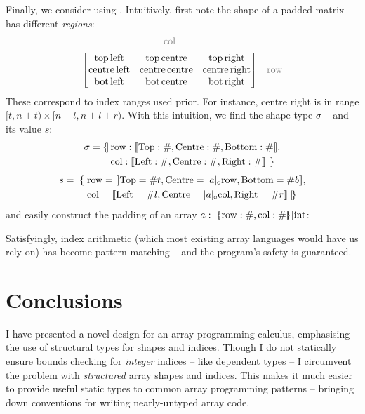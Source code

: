 \needspace{3em}
\noindent
Finally, we consider using \starr{}. Intuitively, first note the shape of a padded matrix has different \textit{regions}: \\[-0.5em]
$$
\begin{matrix}
{\color{gray} \mathrm{col}} & \\[0.5em]
\begin{bmatrix}
\mathrm{top\, left} & \mathrm{top\, centre} & \mathrm{top\, right} \\
\mathrm{centre\, left} & \mathrm{centre\, centre} & \mathrm{centre\, right} \\
\mathrm{bot\, left} & \mathrm{bot\, centre} & \mathrm{bot\, right} \\
\end{bmatrix} & {\color{gray} \mathrm{row}} 
\end{matrix} $$
These correspond to index ranges used prior. For instance, centre right is in range $[t, n + t) \times [n + l, n + l + r)$.
With this intuition, we find the \starr{} shape type $\sigma$ -- and its value $s$:
\begin{align*}
\sigma =  \{\!\mid &\, \mathrm{row}: \sconcattype{\mathrm{Top}: \ssized, \mathrm{Centre}: \ssized,\mathrm{Bottom}: \ssized}, \\ 
&\, \mathrm{col} : \sconcattype{\mathrm{Left}: \ssized, \mathrm{Centre}: \ssized,\mathrm{Right}: \ssized} \mid\!\} 
\end{align*}
\vspace{-2em}
\begin{align*}
s =\; \{\!\mid &\,\mathrm{row}= \sconcatval{\mathrm{Top}= \ssize t, \mathrm{Centre}= \sproductproj{\sshape{a}}{\mathrm{row}}, \mathrm{Bottom}= \ssize b}, \\ 
&\,\mathrm{col}= \sconcatval{ \mathrm{Left}= \ssize l, \mathrm{Centre}= \sproductproj{\sshape{a}}{\mathrm{col}}, \mathrm{Right}= \ssize r} \mid\!\}
\end{align*}
and easily construct the padding of an array $a : [\sproducttype{\mathrm{row} : \ssized,\mathrm{col} : \ssized }] \mathrm{int} $:

Satisfyingly, index arithmetic (which most existing array languages would have us rely on) has become pattern matching -- and the program's safety is guaranteed.

\section{Conclusions}

I have presented a novel design for an array programming calculus, emphasising the use of structural types for shapes and indices. 
Though I do not statically ensure bounds checking for \emph{integer} indices -- like dependent types -- I circumvent the problem with \emph{structured} array shapes and indices. 
This makes it much easier to provide useful static types to common array programming patterns -- bringing down conventions for writing nearly-untyped array code. 

